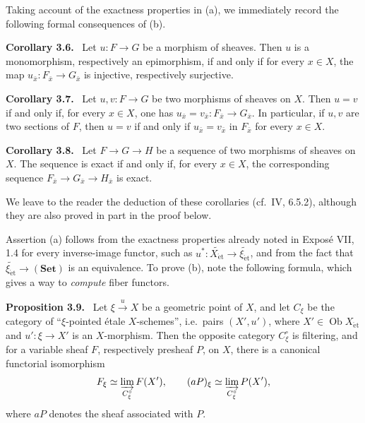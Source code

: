 \documentclass[11pt]{article}
\newcommand{\Ob}{\operatorname{Ob}}
\newcommand{\et}{\mathrm{\acute{e}t}}
\newcommand{\ie}{i.e.\ }
\newcommand{\cf}{cf.\ }
\newenvironment{statement}[1]{\par\medskip\noindent\textbf{#1.}\ }{\par\medskip}
\begin{document}
Taking account of the exactness properties in (a), we immediately record the following formal consequences of (b).

\begin{statement}{Corollary 3.6}
Let \(u:F\to G\) be a morphism of sheaves. Then \(u\) is a monomorphism, respectively an epimorphism, if and only if for every \(x\in X\), the map \(u_{\bar x}:F_{\bar x}\to G_{\bar x}\) is injective, respectively surjective.
\end{statement}

\begin{statement}{Corollary 3.7}
Let \(u,v:F\to G\) be two morphisms of sheaves on \(X\). Then \(u=v\) if and only if, for every \(x\in X\), one has \(u_{\bar x}=v_{\bar x}:F_{\bar x}\to G_{\bar x}\). In particular, if \(u,v\) are two sections of \(F\), then \(u=v\) if and only if \(u_{\bar x}=v_{\bar x}\) in \(F_{\bar x}\) for every \(x\in X\).
\end{statement}

\begin{statement}{Corollary 3.8}
Let \(F\to G\to H\) be a sequence of two morphisms of sheaves on \(X\). The sequence is exact if and only if, for every \(x\in X\), the corresponding sequence \(F_{\bar x}\to G_{\bar x}\to H_{\bar x}\) is exact.
\end{statement}

We leave to the reader the deduction of these corollaries (\cf IV, 6.5.2), although they are also proved in part in the proof below.

Assertion (a) follows from the exactness properties already noted in Expos\'e VII, 1.4 for every inverse-image functor, such as \(u^*:\widetilde{X_{\et}}\to\widetilde{\xi_{\et}}\), and from the fact that \(\widetilde{\xi_{\et}}\to(\mathbf{Set})\) is an equivalence. To prove (b), note the following formula, which gives a way to \emph{compute} fiber functors.

\begin{statement}{Proposition 3.9}
Let \(\xi\xrightarrow{u}X\) be a geometric point of \(X\), and let \(C_\xi\) be the category of ``\(\xi\)-pointed \'etale \(X\)-schemes'', \ie pairs \((X',u')\), where \(X'\in\Ob X_{\et}\) and \(u':\xi\to X'\) is an \(X\)-morphism. Then the opposite category \(C_\xi^\circ\) is filtering, and for a variable sheaf \(F\), respectively presheaf \(P\), on \(X\), there is a canonical functorial isomorphism
\[
F_\xi\simeq \varinjlim_{C_\xi^\circ}F(X'),\qquad
(aP)_\xi\simeq \varinjlim_{C_\xi^\circ}P(X'),
\]
where \(aP\) denotes the sheaf associated with \(P\).
\end{statement}
\end{document}
